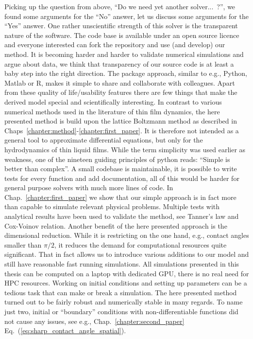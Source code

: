Picking up the question from above, ``Do we need yet another solver...~?'', we found some arguments for the ``No'' answer, let us discuss some arguments for the ``Yes'' answer.
One rather unscientific strength of this solver is the transparent nature of the software. 
The code base is available under an open source licence and everyone interested can fork the repository and use (and develop) our method.
It is becoming harder and harder to validate numerical simulations and argue about data, we think that transparency of our source code is at least a baby step into the right direction. 
The package approach, similar to e.g., Python, Matlab or R, makes it simple to share and collaborate with colleagues.
Apart from these quality of life/usability features there are few things that make the derived model special and scientifically interesting.
In contrast to various numerical methods used in the literature of thin film dynamics, the here presented method is build upon the lattice Boltzmann method as described in Chaps~\ref{chapter:method}-\ref{chapter:first_paper}.
It is therefore not intended as a general tool to approximate differential equations, but only for the hydrodynamics of thin liquid films.
While the term simplicity was used earlier as weakness, one of the nineteen guiding principles of python reads: ``Simple is better than complex''.
A small codebase is maintainable, it is possible to write tests for every function and add documentation, all of this would be harder for general purpose solvers with much more lines of code.
In Chap.~\ref{chapter:first_paper} we show that our simple approach is in fact more than capable to simulate relevant physical problems.
Multiple tests with analytical results have been used to validate the method, see Tanner's law and Cox-Voinov relation.
Another benefit of the here presented approach is the dimensional reduction.
While it is restricting on the one hand, e.g., contact angles smaller than $\pi/2$, it reduces the demand for computational resources quite significant.
That in fact allows us to introduce various additions to our model and still have reasonable fast running simulations.
All simulations presented in this thesis can be computed on a laptop with dedicated GPU, there is no real need for HPC resources.
Working on initial conditions and setting up parameters can be a tedious task that can make or break a simulation.
The here presented method turned out to be fairly robust and numerically stable in many regards.
To name just two, initial or ``boundary'' conditions with non-differentiable functions did not cause any issues, see e.g., Chap.~\ref{chapter:second_paper} Eq.~(\ref{eq:sharp_contact_angle_spatial}).
